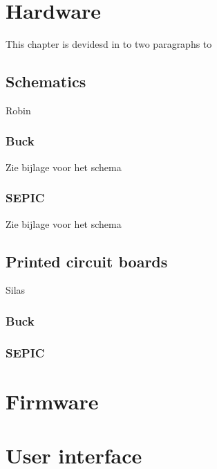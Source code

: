 \section{Hardware}
This chapter is devidesd in to two paragraphs to 

\subsection{Schematics}
Robin

\subsubsection{Buck}
Zie bijlage voor het schema

\subsubsection{SEPIC}
Zie bijlage voor het schema

\subsection{Printed circuit boards}
Silas

%
%
%

\subsubsection{Buck}

\subsubsection{SEPIC}

\section{Firmware}

\section{User interface}


